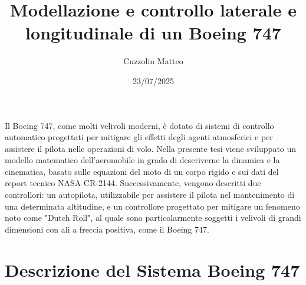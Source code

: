 \documentclass[12pt,a4paper,twoside]{extreport}
\title{Modellazione e controllo laterale e longitudinale di un Boeing 747}
\author{Cuzzolin Matteo}
\date{23/07/2025}
\begin{document}
\allowdisplaybreaks
{}
\pagestyle{empty} %


\cleardoublepage

\abstract

Il Boeing 747, come molti velivoli moderni, è dotato di sistemi di controllo automatico progettati per mitigare gli effetti degli agenti atmosferici e per assistere il pilota nelle operazioni di volo.
Nella presente tesi viene sviluppato un modello matematico dell'aeromobile in grado di descriverne la dinamica e la cinematica, basato sulle equazioni del moto di un corpo rigido e sui dati del report tecnico NASA CR-2144.
Successivamente, vengono descritti due controllori: un autopilota, utilizzabile per assistere il pilota nel mantenimento di una determinata altitudine, e un controllore progettato per mitigare un fenomeno noto come "Dutch Roll", al quale sono particolarmente soggetti i velivoli di grandi dimensioni con ali a freccia positiva, come il Boeing 747.


\cleardoublepage


\pagestyle{plain} %
\setcounter{page}{1}
\tableofcontents

\cleardoublepage
\thispagestyle{empty}
\null
\newpage


\chapter{Descrizione del Sistema Boeing 747}



\end{document}
